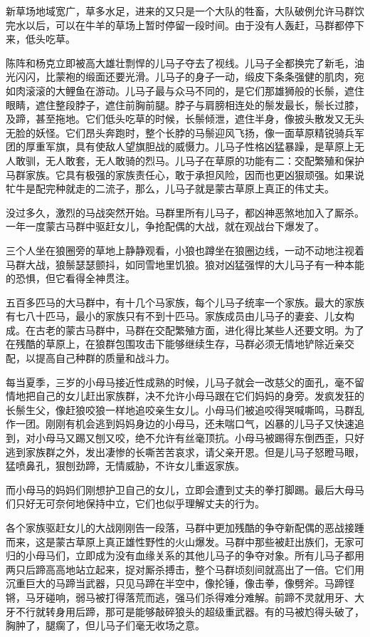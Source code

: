 \par 新草场地域宽广，草多水足，进来的又只是一个大队的牲畜，大队破例允许马群饮完水以后，可以在牛羊的草场上暂时停留一段时间。由于没有人轰赶，马群都停下来，低头吃草。
\par 陈阵和杨克立即被高大雄壮剽悍的儿马子夺去了视线。儿马子全都换完了新毛，油光闪闪，比蒙袍的缎面还要光滑。儿马子的身子一动，缎皮下条条强健的肌肉，宛如肉滚滚的大鲤鱼在游动。儿马子最与众马不同的，是它们那雄狮般的长鬃，遮住眼睛，遮住整段脖子，遮住前胸前腿。脖子与肩膀相连处的鬃发最长，鬃长过膝，及蹄，甚至拖地。它们低头吃草的时候，长鬃倾泄，遮住半身，像披头散发又无头无脸的妖怪。它们昂头奔跑时，整个长脖的马鬃迎风飞扬，像一面草原精锐骑兵军团的厚重军旗，具有使敌人望旗胆战的威慑力。儿马子性格凶猛暴躁，是草原上无人敢驯，无人敢套，无人敢骑的烈马。儿马子在草原的功能有二：交配繁殖和保护马群家族。它具有极强的家族责任心，敢于承担风险，因而也更凶狠顽强。如果说牤牛是配完种就走的二流子，那么，儿马子就是蒙古草原上真正的伟丈夫。
\par 没过多久，激烈的马战突然开始。马群里所有儿马子，都凶神恶煞地加入了厮杀。一年一度蒙古马群中驱赶女儿，争抢配偶的大战，就在观战台下爆发了。
\par 三个人坐在狼圈旁的草地上静静观看，小狼也蹲坐在狼圈边线，一动不动地注视着马群大战，狼鬃瑟瑟颤抖，如同雪地里饥狼。狼对凶猛强悍的大儿马子有一种本能的恐惧，但它看得全神贯注。
\par 五百多匹马的大马群中，有十几个马家族，每个儿马子统率一个家族。最大的家族有七八十匹马，最小的家族只有不到十匹马。家族成员由儿马子的妻妾、儿女构成。在古老的蒙古马群中，马群在交配繁殖方面，进化得比某些人还要文明。为了在残酷的草原上，在狼群包围攻击下能够继续生存，马群必须无情地铲除近亲交配，以提高自己种群的质量和战斗力。
\par 每当夏季，三岁的小母马接近性成熟的时候，儿马子就会一改慈父的面孔，毫不留情地把自己的女儿赶出家族群，决不允许小母马跟在它们妈妈的身旁。发疯发狂的长鬃生父，像赶狼咬狼一样地追咬亲生女儿。小母马们被追咬得哭喊嘶鸣，马群乱作一团。刚刚有机会逃到妈妈身边的小母马，还未喘口气，凶暴的儿马子又快速追到，对小母马又踢又刨又咬，绝不允许有丝毫顶抗。小母马被踢得东倒西歪，只好逃到家族群之外，发出凄惨的长嘶苦苦哀求，请父亲开恩。但是儿马子怒瞪马眼，猛喷鼻孔，狠刨劲蹄，无情威胁，不许女儿重返家族。
\par 而小母马的妈妈们刚想护卫自己的女儿，立即会遭到丈夫的拳打脚踢。最后大母马们只好无可奈何地保持中立，它们也似乎理解丈夫的行为。
\par 各个家族驱赶女儿的大战刚刚告一段落，马群中更加残酷的争夺新配偶的恶战接踵而来，这是蒙古草原上真正雄性野性的火山爆发。马群中那些被赶出族们，无家可归的小母马们，立即成为没有血缘关系的其他儿马子的争夺对象。所有儿马子都用两只后蹄高高地站立起来，捉对厮杀搏击，整个马群顷刻间就高出了一倍。它们用沉重巨大的马蹄当武器，只见马蹄在半空中，像抡锤，像击拳，像劈斧。马蹄铿锵，马牙碰响，弱马被打得落荒而逃，强马们杀得难分难解。前蹄不灵就用牙、大牙不行就转身用后蹄，那可是能够敲碎狼头的超级重武器。有的马被尥得头破了，胸肿了，腿瘸了，但儿马子们毫无收场之意。
